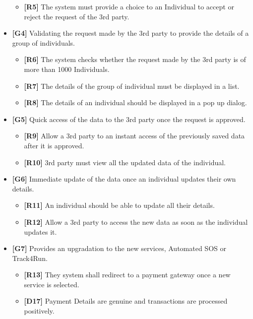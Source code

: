 \begin{itemize}
\begin{itemize}
\item\textbf{[R5]} The system must provide a choice to an Individual to accept or reject the request of the 3rd party.\newline
\end{itemize}
\item\textbf{[G4]} Validating the request made by the 3rd party to provide the details of a group of individuals.
\begin{itemize}
\item\textbf{[R6]} The system checks whether the request made by the 3rd party is of more than 1000 Individuals.
\item\textbf{[R7]} The details of the group of individual must be displayed in a list.
\item\textbf{[R8]} The details of an individual should be displayed in a pop up dialog.\newline
\end{itemize}

\item\textbf{[G5]} Quick access of the data to the 3rd party once the request is approved.

\begin{itemize}
\item\textbf{[R9]} Allow a 3rd party to an instant access of the previously saved data after it is approved.
\item\textbf{[R10]} 3rd party must view all the updated data of the individual. \newline
\end{itemize}

\item\textbf{[G6]} Immediate update of the data once an individual updates their own details.

\begin{itemize}
\item\textbf{[R11]} An individual should be able to update all their details.
\item\textbf{[R12]} Allow a 3rd party to access the new data as soon as the individual updates it.\newline
\end{itemize}

\item\textbf{[G7]}  Provides an upgradation to the new services, Automated SOS or Track4Run.

\begin{itemize}
\item\textbf{[R13]} They system shall redirect to a payment gateway once a new service is selected.
\item\textbf{[D17]} Payment Details are genuine and transactions are processed positively.\newline
\end{itemize}


\end{itemize}

